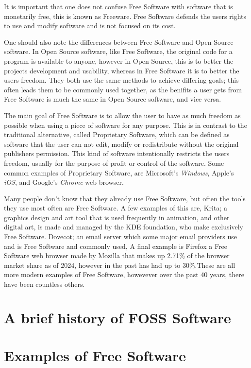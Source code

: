 \documentclass[a4paper,12pt]{article}
\begin{document}
{It is important that one does not confuse Free Software with software that is monetarily free, 
this is known as Freeware. Free Software defends the users rights to use and modify software and
is not focused on its cost.

One should also note the differences between Free Software and Open Source software. In Open Source
software, like Free Software, the original code for a program is available to anyone, however
in Open Source, this is to better the projects development and usability, whereas in Free Software
it is to better the users freedom. They both use the same methods to achieve differing goals; this
often leads them to be commonly used together, as the benifits a user gets from Free Software is 
much the same in Open Source software, and vice versa.

The main goal of Free Software is to allow the user to have as much freedom as possible when using 
a piece of software for any purpose. This is in contrast to the traditional alternative, called
Proprietary Software, which can be defined as software that the user can not edit, modify or 
redistribute without the original publishers permission. This kind of software intentionally 
restricts the users freedom, usually for the purpose of profit or control of the software. Some 
common examples of Proprietary Software, are Microsoft's \textit{Windows}, Apple's \textit{iOS}, 
and Google's \textit{Chrome} web browser.

Many people don't know that they already use Free Software\cite{COMMONfoss}, but often the tools
they use most often are Free Software. A few examples of this are, Krita\cite{KRITA}; a graphics 
design and art tool that is used frequently in animation, and other digital art, is made and 
managed by the KDE foundation\cite{KDE}, who make exclusively Free Software. Dovecot\cite{DOVECOT}; 
an email server which some major email providers use and is Free Software and commonly used, 
 A final example is Firefox\cite{FIREFOX} a Free Software web browser made by Mozilla that 
makes up 2.71\% of the browser market share as of 2024, however in the past has had up to 
30\%\cite{BROWSERmarketshare}.These are all more modern examples of Free Software, howevever over 
the past 40 years, there have been countless others. 
\section{A brief history of FOSS Software}
\section{Examples of Free Software}
}
\end{document}
